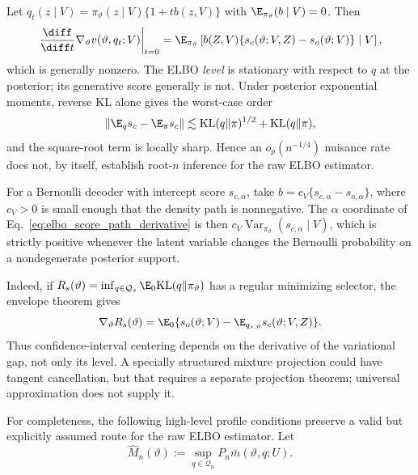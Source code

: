 \begin{proposition}
\label{prop:no_automatic_orthogonality}
Let
$q_t(z\mid V)=\pi_\vartheta(z\mid V)\{1+t b(z,V)\}$ with
$\E_{\pi_\vartheta}(b\mid V)=0$.  Then
\begin{equation}
 \left.\frac{\diff}{\diff t}\nabla_\vartheta
 v(\vartheta,q_t;V)\right|_{t=0}
 =\E_{\pi_\vartheta}
 \left[b(Z,V)\{s_c(\vartheta;V,Z)-s_o(\vartheta;V)\}\mid V\right],
 \label{eq:elbo_score_path_derivative}
\end{equation}
which is generally nonzero.  The ELBO \emph{level} is stationary with respect
to $q$ at the posterior; its generative score generally is not.  Under
posterior exponential moments, reverse KL alone gives the worst-case order
\[
 \|\E_qs_c-\E_\pi s_c\|
 \lesssim \mathrm{KL}(q\|\pi)^{1/2}+\mathrm{KL}(q\|\pi),
\]
and the square-root term is locally sharp.  Hence an $o_p(n^{-1/4})$ nuisance
rate does not, by itself, establish root-$n$ inference for the raw ELBO
estimator.

For a Bernoulli decoder with intercept score $s_{c,\alpha}$, take
$b=c_V\{s_{c,\alpha}-s_{o,\alpha}\}$, where $c_V>0$ is small enough that the
density path is nonnegative.  The $\alpha$ coordinate of
Eq.~\eqref{eq:elbo_score_path_derivative} is then
$c_V\operatorname{Var}_{\pi_\vartheta}(s_{c,\alpha}\mid V)$, which is strictly
positive whenever the latent variable changes the Bernoulli probability on a
nondegenerate posterior support.
\end{proposition}

Indeed, if
$R_s(\vartheta)=\inf_{q\in\mathcal Q_s}
\E_0\mathrm{KL}(q\|\pi_\vartheta)$ has a regular minimizing selector, the
envelope theorem gives
\[
 \nabla_\vartheta R_s(\vartheta)
 =\E_0\{s_o(\vartheta;V)-\E_{q_{s,\vartheta}}s_c(\vartheta;V,Z)\}.
\]
Thus confidence-interval centering depends on the derivative of the
variational gap, not only its level.  A specially structured mixture
projection could have tangent cancellation, but that requires a separate
projection theorem; universal approximation does not supply it.

For completeness, the following high-level profile conditions preserve a
valid but explicitly assumed route for the raw ELBO estimator.  Let
\[
 \widehat M_n(\vartheta):=\sup_{q\in\mathcal Q_n}
 P_n\bar m(\vartheta,q;U).
\]

